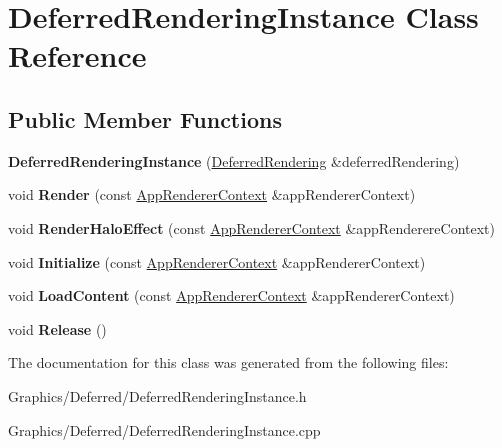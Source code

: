 \hypertarget{classDeferredRenderingInstance}{}\section{Deferred\+Rendering\+Instance Class Reference}
\label{classDeferredRenderingInstance}
\subsection*{Public Member Functions}
\begin{DoxyCompactItemize}
\item 
\mbox{\label{classDeferredRenderingInstance_a3bfef0791a4ba8701b3f4a3cf9e673f6}} 
{\bfseries Deferred\+Rendering\+Instance} (\hyperlink{classDeferredRendering}{Deferred\+Rendering} \&deferred\+Rendering)
\item 
\mbox{\label{classDeferredRenderingInstance_af8d6d9178c6cb0073363c8327e4613ff}} 
void {\bfseries Render} (const \hyperlink{structAppRendererContext}{App\+Renderer\+Context} \&app\+Renderer\+Context)
\item 
\mbox{\label{classDeferredRenderingInstance_a4d54af900fdd9a6b22c8f64b572a5174}} 
void {\bfseries Render\+Halo\+Effect} (const \hyperlink{structAppRendererContext}{App\+Renderer\+Context} \&app\+Renderere\+Context)
\item 
\mbox{\label{classDeferredRenderingInstance_a422f21b8061c850047b09f56e49e62b9}} 
void {\bfseries Initialize} (const \hyperlink{structAppRendererContext}{App\+Renderer\+Context} \&app\+Renderer\+Context)
\item 
\mbox{\label{classDeferredRenderingInstance_a7b0a5d0c4da9d4625e8640ea1edd4ccf}} 
void {\bfseries Load\+Content} (const \hyperlink{structAppRendererContext}{App\+Renderer\+Context} \&app\+Renderer\+Context)
\item 
\mbox{\label{classDeferredRenderingInstance_a3b165af431d19c7b01aa0fe9d83f6f77}} 
void {\bfseries Release} ()
\end{DoxyCompactItemize}


The documentation for this class was generated from the following files\+:\begin{DoxyCompactItemize}
\item 
Graphics/\+Deferred/Deferred\+Rendering\+Instance.\+h\item 
Graphics/\+Deferred/Deferred\+Rendering\+Instance.\+cpp\end{DoxyCompactItemize}
